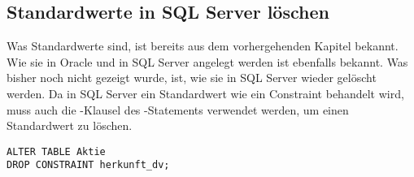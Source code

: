       \subsection{Standardwerte in SQL Server l\"oschen}
        \label{sqlserverdefaultconstraint}
        Was Standardwerte sind, ist bereits aus dem vorhergehenden Kapitel bekannt. Wie sie in Oracle und in SQL Server angelegt werden ist ebenfalls bekannt. Was bisher noch nicht gezeigt wurde, ist, wie sie in SQL Server wieder gel\"oscht werden. Da in SQL Server ein Standardwert wie ein Constraint behandelt wird, muss auch die -Klausel des -Statements verwendet werden, um einen Standardwert zu l\"oschen.
        \begin{lstlisting}[language=ms_sql,caption={Einen Standardwert in SQL Server l\"oschen},label=sql09_23]
ALTER TABLE Aktie
DROP CONSTRAINT herkunft_dv;
        \end{lstlisting}
